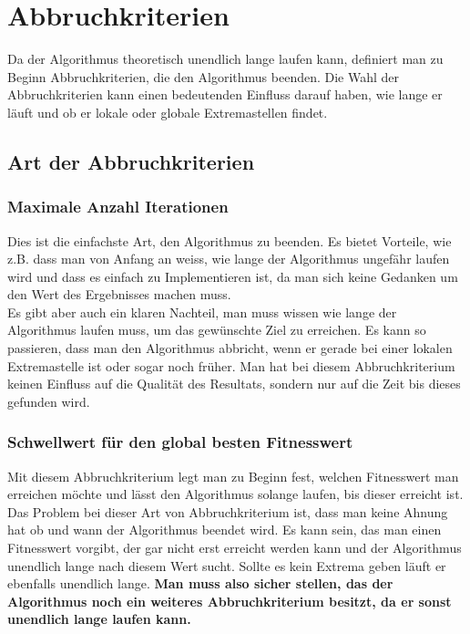 \section{Abbruchkriterien}

Da der Algorithmus theoretisch unendlich lange laufen kann, definiert man zu Beginn Abbruchkriterien, die den Algorithmus beenden.
Die Wahl der Abbruchkriterien kann einen bedeutenden Einfluss darauf haben, wie lange er läuft und ob er lokale oder globale Extremastellen findet.

\subsection{Art der Abbruchkriterien}

\subsubsection{Maximale Anzahl Iterationen}
Dies ist die einfachste Art, den Algorithmus zu beenden. Es bietet Vorteile, wie z.B. dass man von Anfang an weiss, wie lange der Algorithmus ungefähr laufen wird und dass es einfach zu Implementieren ist, da man sich keine Gedanken um den Wert des Ergebnisses machen muss. \\
Es gibt aber auch ein klaren Nachteil, man muss wissen wie lange der Algorithmus laufen muss, um das gewünschte Ziel zu erreichen. Es kann so passieren, dass man den Algorithmus abbricht, wenn er gerade bei einer lokalen Extremastelle ist oder sogar noch früher. Man hat bei diesem Abbruchkriterium keinen Einfluss auf die Qualität des Resultats, sondern nur auf die Zeit bis dieses gefunden wird.

\subsubsection{Schwellwert für den global besten Fitnesswert}
Mit diesem Abbruchkriterium legt man zu Beginn fest, welchen Fitnesswert man erreichen möchte und lässt den Algorithmus solange laufen, bis dieser erreicht ist.\\
Das Problem bei dieser Art von Abbruchkriterium ist, dass man keine Ahnung hat ob und wann der Algorithmus beendet wird. Es kann sein, das man einen Fitnesswert vorgibt, der gar nicht erst erreicht werden kann und der Algorithmus unendlich lange nach diesem Wert sucht. Sollte es kein Extrema geben läuft er ebenfalls unendlich lange. \textbf{Man muss also sicher stellen, das der Algorithmus noch ein weiteres Abbruchkriterium besitzt, da er sonst unendlich lange laufen kann.}

